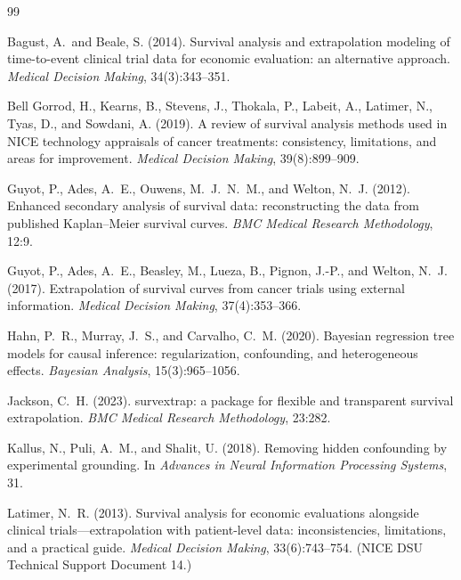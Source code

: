 \documentclass[11pt]{article}
\begin{document}
\begin{thebibliography}{99}

Bagust, A.\ and Beale, S. (2014).
\newblock Survival analysis and extrapolation modeling of time-to-event
clinical trial data for economic evaluation: an alternative approach.
\newblock \emph{Medical Decision Making}, 34(3):343--351.

Bell Gorrod, H., Kearns, B., Stevens, J., Thokala, P., Labeit, A.,
Latimer, N., Tyas, D., and Sowdani, A. (2019).
\newblock A review of survival analysis methods used in NICE technology
appraisals of cancer treatments: consistency, limitations, and areas for
improvement.
\newblock \emph{Medical Decision Making}, 39(8):899--909.

Guyot, P., Ades, A.~E., Ouwens, M.~J.~N.~M., and Welton, N.~J. (2012).
\newblock Enhanced secondary analysis of survival data: reconstructing the
data from published Kaplan--Meier survival curves.
\newblock \emph{BMC Medical Research Methodology}, 12:9.

Guyot, P., Ades, A.~E., Beasley, M., Lueza, B., Pignon, J.-P., and
Welton, N.~J. (2017).
\newblock Extrapolation of survival curves from cancer trials using external
information.
\newblock \emph{Medical Decision Making}, 37(4):353--366.

Hahn, P.~R., Murray, J.~S., and Carvalho, C.~M. (2020).
\newblock Bayesian regression tree models for causal inference:
regularization, confounding, and heterogeneous effects.
\newblock \emph{Bayesian Analysis}, 15(3):965--1056.

Jackson, C.~H. (2023).
\newblock survextrap: a package for flexible and transparent survival
extrapolation.
\newblock \emph{BMC Medical Research Methodology}, 23:282.

Kallus, N., Puli, A.~M., and Shalit, U. (2018).
\newblock Removing hidden confounding by experimental grounding.
\newblock In \emph{Advances in Neural Information Processing Systems}, 31.

Latimer, N.~R. (2013).
\newblock Survival analysis for economic evaluations alongside clinical
trials---extrapolation with patient-level data: inconsistencies,
limitations, and a practical guide.
\newblock \emph{Medical Decision Making}, 33(6):743--754.
\newblock (NICE DSU Technical Support Document 14.)


\end{thebibliography}
\end{document}
